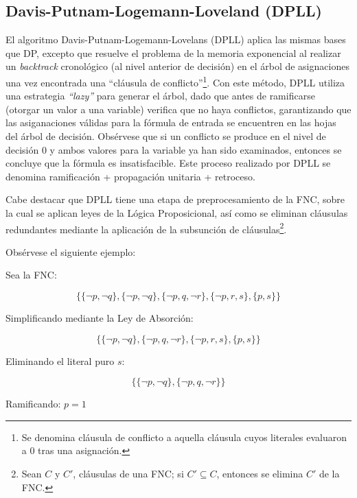\subsection{Davis-Putnam-Logemann-Loveland (DPLL)}
El algoritmo Davis-Putnam-Logemann-Lovelans (DPLL) aplica las mismas bases que DP, excepto que resuelve el problema de la memoria exponencial al realizar un \textit{backtrack} cronológico (al nivel anterior de decisión) en el árbol de asignaciones una vez encontrada una ``cláusula de conflicto''\footnote{Se denomina cláusula de conflicto a aquella cláusula cuyos literales evaluaron a 0 tras una asignación.}. Con este método, DPLL utiliza una estrategia \textit{``lazy''} para generar el árbol, dado que antes de ramificarse (otorgar un valor a una variable) verifica que no haya conflictos, garantizando que las asiganaciones válidas para la fórmula de entrada se encuentren en las hojas del árbol de decisión. Obsérvese que si un conflicto se produce en el nivel de decisión 0 y ambos valores para la variable ya han sido examinados, entonces se concluye que la fórmula es insatisfacible. Este proceso realizado por DPLL se denomina ramificación + propagación unitaria + retroceso.

Cabe destacar que DPLL tiene una etapa de preprocesamiento de la FNC, sobre la cual se aplican leyes de la Lógica Proposicional, así como se eliminan cláusulas redundantes mediante la aplicación de la subsunción de cláusulas\footnote{Sean $C$ y $C'$, cláusulas de una FNC; si $C' \subseteq C$, entonces se elimina $C'$ de la FNC.}. 

Obsérvese el siguiente ejemplo:

Sea la FNC:

\begin{equation*}
\{\{\neg p,\neg q\},\{\neg p, \neg q\},\{\neg p,q,\neg r\},\{\neg p,r,s\},\{p,s\}\}
\end{equation*}

Simplificando mediante la Ley de Absorción:

\begin{equation*}
\{\{\neg p,\neg q\},\{\neg p,q,\neg r\},\{\neg p,r,s\},\{p,s\}\}
\end{equation*}

Eliminando el literal puro $s$:

\begin{equation*}
\{\{\neg p,\neg q\},\{\neg p,q,\neg r\}\}
\end{equation*}

Ramificando: $p=1$

